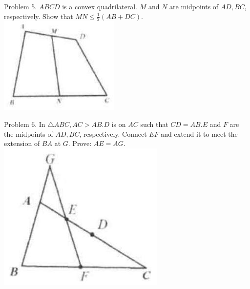 \documentclass[10pt]{article}
\begin{document}
Problem 5. \(A B C D\) is a convex quadrilateral. \(M\) and \(N\) are midpoints of \(A D, B C\), respectively. Show that \(M N \leq \frac{1}{2}(A B+D C)\).\\
\includegraphics[max width=\textwidth, center]{2025_04_17_97bc1f7e44d93c271a88g-044(4)}


Problem 6. In \(\triangle A B C, A C>A B . D\) is on \(A C\) such that \(C D=A B . E\) and \(F\) are the midpoints of \(A D, B C\), respectively. Connect \(E F\) and extend it to meet the extension of \(B A\) at \(G\). Prove: \(A E=A G\).\\
\includegraphics[max width=\textwidth, center]{2025_04_17_97bc1f7e44d93c271a88g-045(1)}
\end{document}
